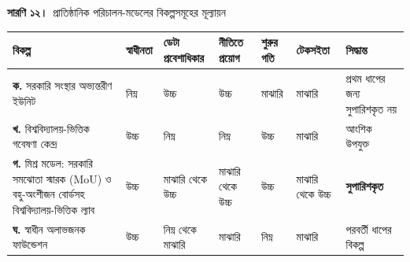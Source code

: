 \documentclass[border=10pt]{standalone}
\begin{document}
\begin{minipage}{22cm}
{\large\bfseries সারণি ১২।}\ {\large প্রাতিষ্ঠানিক পরিচালন-মডেলের বিকল্পসমূহের মূল্যায়ন}\par\vspace{7pt}
\small
{}
\begin{tabularx}{\linewidth}{@{}>{\hsize=1.793\hsize\raggedright\arraybackslash}X>{\hsize=0.897\hsize\raggedright\arraybackslash}X>{\hsize=0.759\hsize\raggedright\arraybackslash}X>{\hsize=0.759\hsize\raggedright\arraybackslash}X>{\hsize=0.759\hsize\raggedright\arraybackslash}X>{\hsize=0.931\hsize\raggedright\arraybackslash}X>{\hsize=1.103\hsize\raggedright\arraybackslash}X@{}}
\arrayrulecolor{bapilrule}\toprule
\rowcolor{white}\textbf{বিকল্প} & \textbf{স্বাধীনতা} & \textbf{ডেটা প্রবেশাধিকার} & \textbf{নীতিতে প্রয়োগ} & \textbf{শুরুর গতি} & \textbf{টেকসইতা} & \textbf{সিদ্ধান্ত} \\
\midrule
\textbf{ক.} সরকারি সংস্থার অভ্যন্তরীণ ইউনিট & নিম্ন & উচ্চ & উচ্চ & মাঝারি & মাঝারি & প্রথম ধাপের জন্য সুপারিশকৃত নয় \\
\textbf{খ.} বিশ্ববিদ্যালয়-ভিত্তিক গবেষণা কেন্দ্র & উচ্চ & নিম্ন & নিম্ন & উচ্চ & মাঝারি & আংশিক উপযুক্ত \\
\textbf{গ.} মিশ্র মডেল: সরকারি সমঝোতা স্মারক (MoU) ও বহু-অংশীজন বোর্ডসহ বিশ্ববিদ্যালয়-ভিত্তিক ল্যাব & উচ্চ & মাঝারি থেকে উচ্চ & মাঝারি থেকে উচ্চ & উচ্চ & মাঝারি থেকে উচ্চ & \textbf{সুপারিশকৃত} \\
\textbf{ঘ.} স্বাধীন অলাভজনক ফাউন্ডেশন & উচ্চ & নিম্ন থেকে মাঝারি & মাঝারি & নিম্ন & মাঝারি & পরবর্তী ধাপের বিকল্প \\
\bottomrule
\end{tabularx}
\par\vspace{5pt}{\footnotesize\itshape পাঁচটি মানদণ্ডে লেখকের গুণগত মূল্যায়ন; প্রথম ধাপের সম্ভাব্যতা সমীক্ষায় (ডেলিভারেবল D1.3) যাচাই করা হবে।}
\par{}
\end{minipage}
\end{document}
